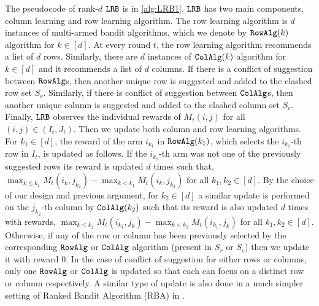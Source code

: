 The pseudocode of rank-$d$ ${\tt LRB}$ is in \cref{alg:LRB1}. ${\tt LRB}$ has two main components, column learning and row learning algorithm. The row learning algorithm is $d$ instances of multi-armed bandit algorithms, which we denote by ${\tt RowAlg}(k)$ algorithm for $k \in [d]$. At every round $t$, the row learning algorithm recommends a list of $d$ rows. Similarly, there are $d$ instances of ${\tt ColAlg}(k)$ algorithm for $k \in [d]$ and it recommends a list of $d$ columns. If there is a conflict of suggestion between ${\tt RowAlg}$s, then another unique row is suggested and added to the clashed row set $S_r$. Similarly, if there is conflict of suggestion between ${\tt ColAlg}$s, then another unique column is suggested and added to the clashed column set  $S_c$. Finally, ${\tt LRB}$ observes the individual rewards of $M_t(i,j)$ for all $(i,j)\in (I_t, J_t)$. Then we update both column and row learning algorithms. For $k_1 \in [d]$, the reward of the arm $i_{k_1}$ in ${\tt RowAlg}(k_1)$, which selects the $i_{k_1}$-th row in $I_t$, is updated as follows. If the $i_{k_1}$-th arm was not one of the previously suggested rows its reward is updated $d$ times such that, $\max_{k \leq k_1} M_t(i_k, j_{k_2}) - \max_{k < k_1} M_t(i_k, j_{k_2})$ for all $k_1,k_2 \in [d]$. By the choice of our design and previous argument, for $k_2 \in [d]$ a similar update is performed on the $j_{k_2}$-th column by ${\tt ColAlg}(k_2)$ such that its reward is also updated $d$ times with rewards, $\max_{k \leq k_2} M_t(i_{k_1}, j_k)  - \max_{k < k_2} M_t(i_{k_1}, j_k)$ for all $k_1,k_2 \in [d]$. Otherwise, if any of the row or column has been previously selected by the corresponding ${\tt RowAlg}$ or ${\tt ColAlg}$ algorithm (present in $S_r$ or $S_c$) then we update it with reward $0$. In the case of  conflict of suggestion for either rows or columns, only one ${\tt RowAlg}$ or ${\tt ColAlg}$ is updated so that each can focus on a distinct row or column respectively. A similar type of update is also done in a much simpler setting of Ranked Bandit Algorithm (RBA) in \citet{radlinski2008learning}.







